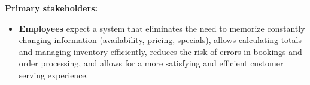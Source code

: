 \documentclass[]{VUMIFTemplateClass}
\newcommand{\warningcomment}[1]{%
    \begin{tcolorbox}[colback=yellow!90, colframe=red, arc=0pt, outer arc=0pt, boxrule=2pt, left=5pt, right=5pt, top=5pt, bottom=5pt]
        \Large\textbf{\textcolor{red}{FIX THIS: }} \normalsize #1
    \end{tcolorbox}
}
\begin{document}
\textbf{Primary stakeholders:}
\begin{itemize}
    \item \textbf{Employees} expect a system that eliminates the need to
    memorize constantly changing information (availability, pricing, specials),
    allows calculating totals and managing inventory efficiently, reduces the
    risk of errors in bookings and order processing, and allows for a more
    satisfying and efficient customer serving experience.
    

\end{itemize}
\end{document}
